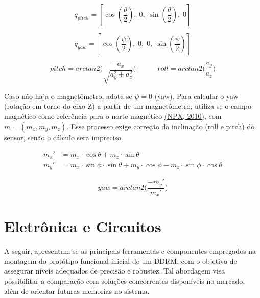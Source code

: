 \documentclass[a4paper, 12pt]{article}
\begin{document}
            \begin{equation}
                q_{pitch} = \left[ \cos\left(\frac{\theta}{2}\right), \; 0, \; \sin\left(\frac{\theta}{2}\right), \; 0 \right] 
            \end{equation}

            \begin{equation}
                q_{yaw} = \left[ \cos\left(\frac{\psi}{2}\right), \; 0, \; 0, \; \sin\left(\frac{\psi}{2}\right) \right]
            \end{equation}            

            \begin{equation}
                pitch = arctan2\bigg(\frac{-a_x}{\sqrt{a_y^2 + a_z^2}}\bigg)
                \,\,\,\,\,\,\,\,\,\,\,\,\,\,\,\,\,\,
                roll = arctan2\bigg(\frac{a_y}{a_z}\bigg)
            \end{equation}

        \vspace{.25cm}
        Caso não haja o magnetômetro, adota-se $\psi = 0$ (yaw). Para calcular o yaw (rotação em torno do eixo Z) a partir de um magnetômetro, utiliza-se o campo magnético como referência para o norte magnético \hyperlink{NPX}{(NPX, 2010)}, com $m = (m_x, m_y, m_z)$. Esse processo exige correção da inclinação (roll e pitch) do sensor, senão o cálculo será impreciso.
        \vspace{-0.5cm}
        
        \begin{align*}
            m_x' &= m_x \cdot \cos\theta + m_z \cdot \sin\theta \\
            m_y' &= m_x \cdot \sin\phi \cdot \sin\theta + m_y \cdot \cos\phi - m_z \cdot \sin\phi \cdot \cos\theta
        \end{align*}

        \begin{equation}
            yaw = arctan2\bigg(\frac{-m_y'}{m_x'}\bigg)
        \end{equation}

        
\newpage
\setcounter{section}{3}
\section{Eletrônica e Circuitos}
    A seguir, apresentam-se as principais ferramentas e componentes empregados na montagem do protótipo funcional inicial de um DDRM, com o objetivo de assegurar níveis adequados de precisão e robustez. Tal abordagem visa possibilitar a comparação com soluções concorrentes disponíveis no mercado, além de orientar futuras melhorias no sistema.
\end{document}
